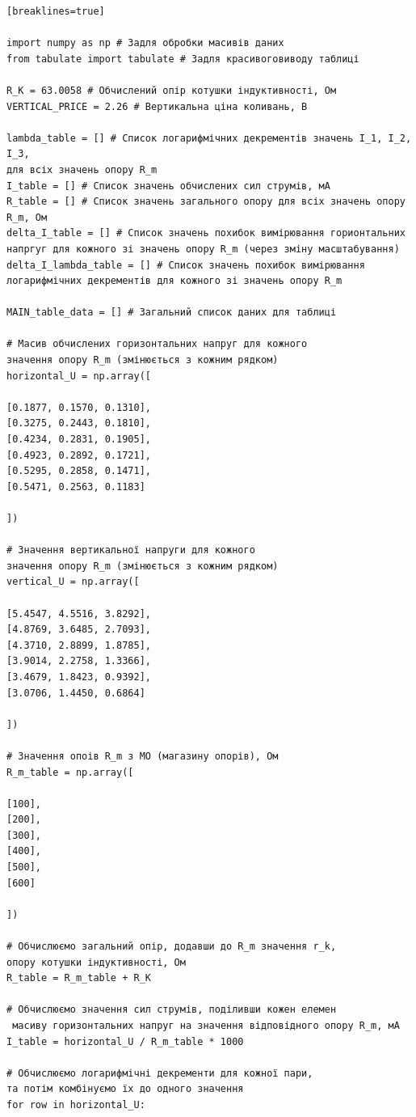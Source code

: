\documentclass[12pt,a4paper]{article}
\begin{document}
    \small{

    \begin{verbatim}[breaklines=true]

import numpy as np # Задля обробки масивів даних
from tabulate import tabulate # Задля красивоговиводу таблиці

R_K = 63.0058 # Обчислений опір котушки індуктивності, Ом
VERTICAL_PRICE = 2.26 # Вертикальна ціна коливань, В

lambda_table = [] # Список логарифмічних декрементів значень I_1, I_2, I_3,
для всіх значень опору R_m
I_table = [] # Список значень обчислених сил струмів, мА
R_table = [] # Список значень загального опору для всіх значень опору R_m, Ом
delta_I_table = [] # Список значень похибок вимірювання горионтальних
напргуг для кожного зі значень опору R_m (через зміну масштабування)
delta_I_lambda_table = [] # Список значень похибок вимірювання
логарифмічних декрементів для кожного зі значень опору R_m

MAIN_table_data = [] # Загальний список даних для таблиці

# Масив обчислених горизонтальних напруг для кожного
значення опору R_m (змінюється з кожним рядком)
horizontal_U = np.array([

[0.1877, 0.1570, 0.1310],
[0.3275, 0.2443, 0.1810],
[0.4234, 0.2831, 0.1905],
[0.4923, 0.2892, 0.1721],
[0.5295, 0.2858, 0.1471],
[0.5471, 0.2563, 0.1183]

])

# Значення вертикальної напруги для кожного
значення опору R_m (змінюється з кожним рядком)
vertical_U = np.array([

[5.4547, 4.5516, 3.8292],
[4.8769, 3.6485, 2.7093],
[4.3710, 2.8899, 1.8785],
[3.9014, 2.2758, 1.3366],
[3.4679, 1.8423, 0.9392],
[3.0706, 1.4450, 0.6864]

])

# Значення опоів R_m з МО (магазину опорів), Ом
R_m_table = np.array([

[100],
[200],
[300],
[400],
[500],
[600]

])

# Обчислюємо загальний опір, додавши до R_m значення r_k,
опору котушки індуктивності, Ом
R_table = R_m_table + R_K

# Обчислюємо значення сил струмів, поділивши кожен елемен
 масиву горизонтальних напруг на значення відповідного опору R_m, мА
I_table = horizontal_U / R_m_table * 1000

# Обчислюємо логарифмічні декременти для кожної пари,
та потім комбінуємо їх до одного значення
for row in horizontal_U:


\end{verbatim}}
\end{document}
